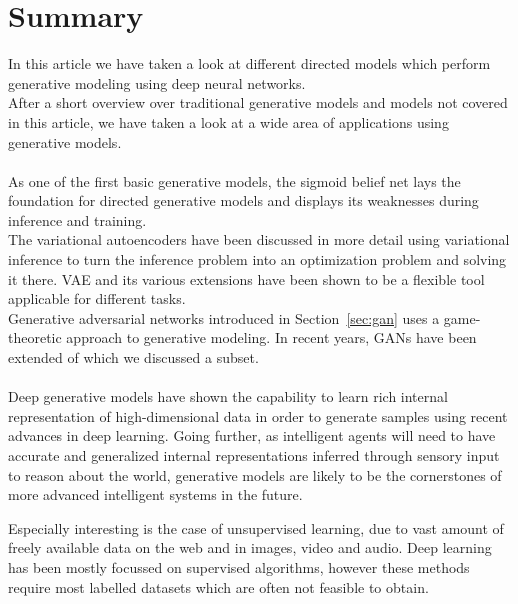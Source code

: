 \section{Summary}
\label{sec:summary}

In this article we have taken a look at different directed models which perform generative modeling using deep neural networks.\\
After a short overview over traditional generative models and models not covered in this article, we have taken a look at a wide area of applications using generative models.\\\\
%
As one of the first basic generative models, the sigmoid belief net lays the foundation for directed generative models and displays its weaknesses during inference and training.\\
The variational autoencoders have been discussed in more detail using variational inference to turn the inference problem into an optimization problem and solving it there.
VAE and its various extensions have been shown to be a flexible tool applicable for different tasks.\\
%
Generative adversarial networks introduced in Section~\ref{sec:gan} uses a game-theoretic approach to generative modeling. In recent years, GANs have been extended of which we discussed a subset.\\\\
%
Deep generative models have shown the capability to learn rich internal representation of high-dimensional data in order to generate samples using recent advances in deep learning.
Going further, as intelligent agents will need to have accurate and generalized internal representations inferred through sensory input to reason about the world, generative models are likely to be the cornerstones of more advanced intelligent systems in the future.


Especially interesting is the case of unsupervised learning, due to vast amount of freely available data on the web and in images, video and audio. Deep learning has been mostly focussed on supervised algorithms, however these methods require most labelled datasets which are often not feasible to obtain.


